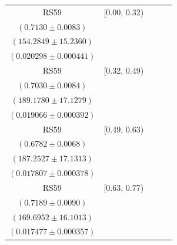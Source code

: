 {\begin{longtable}{|c|c|c|c|c|}
\hline
RS59 & [0.00, 0.32) & \begin{tabular}{@{}c@{}}$0.7491 \pm 0.0056$ \\ $(0.7130 \pm 0.0083)$\end{tabular} & \begin{tabular}{@{}c@{}}$146.8516 \pm 14.5020$ \\ $(154.2849 \pm 15.2360)$\end{tabular} & \begin{tabular}{@{}c@{}}$0.018048 \pm 0.000557$ \\ $(0.020298 \pm 0.000441)$\end{tabular} \\ \hline
RS59 & [0.32, 0.49) & \begin{tabular}{@{}c@{}}$0.7351 \pm 0.0055$ \\ $(0.7030 \pm 0.0084)$\end{tabular} & \begin{tabular}{@{}c@{}}$180.9325 \pm 16.3813$ \\ $(189.1780 \pm 17.1279)$\end{tabular} & \begin{tabular}{@{}c@{}}$0.017115 \pm 0.000492$ \\ $(0.019066 \pm 0.000392)$\end{tabular} \\ \hline
RS59 & [0.49, 0.63) & \begin{tabular}{@{}c@{}}$0.7128 \pm 0.0058$ \\ $(0.6782 \pm 0.0068)$\end{tabular} & \begin{tabular}{@{}c@{}}$178.1819 \pm 16.3015$ \\ $(187.2527 \pm 17.1313)$\end{tabular} & \begin{tabular}{@{}c@{}}$0.016740 \pm 0.000486$ \\ $(0.017807 \pm 0.000378)$\end{tabular} \\ \hline
RS59 & [0.63, 0.77) & \begin{tabular}{@{}c@{}}$0.7432 \pm 0.0054$ \\ $(0.7189 \pm 0.0090)$\end{tabular} & \begin{tabular}{@{}c@{}}$164.1543 \pm 15.5756$ \\ $(169.6952 \pm 16.1013)$\end{tabular} & \begin{tabular}{@{}c@{}}$0.015873 \pm 0.000454$ \\ $(0.017477 \pm 0.000357)$\end{tabular} \\ \hline

\end{longtable}}
